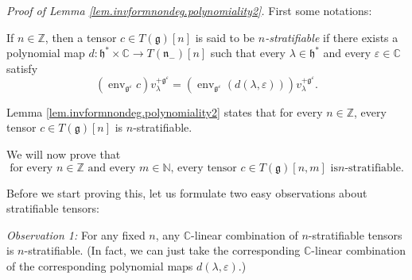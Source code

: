 \documentclass
[numbers=enddot,12pt,final,onecolumn,german,notitlepage]{scrartcl}%
\theoremstyle{definition}
\begin{document}
\textit{Proof of Lemma \ref{lem.invformnondeg.polynomiality2}.} First some notations:

If $n\in\mathbb{Z}$, then a tensor $c\in T\left(  \mathfrak{g}\right)  \left[
n\right]  $ is said to be $n$\textit{-stratifiable} if there exists a
polynomial map $d:\mathfrak{h}^{\ast}\times\mathbb{C}\rightarrow T\left(
\mathfrak{n}_{-}\right)  \left[  n\right]  $ such that every $\lambda
\in\mathfrak{h}^{\ast}$ and every $\varepsilon\in\mathbb{C}$ satisfy%
\[
\left(  \operatorname*{env}\nolimits_{\mathfrak{g}^{\varepsilon}}c\right)
v_{\lambda}^{+\mathfrak{g}^{\varepsilon}}=\left(  \operatorname*{env}%
\nolimits_{\mathfrak{g}^{\varepsilon}}\left(  d\left(  \lambda,\varepsilon
\right)  \right)  \right)  v_{\lambda}^{+\mathfrak{g}^{\varepsilon}}.
\]


Lemma \ref{lem.invformnondeg.polynomiality2} states that for every
$n\in\mathbb{Z}$, every tensor $c\in T\left(  \mathfrak{g}\right)  \left[
n\right]  $ is $n$-stratifiable.

We will now prove that
\begin{equation}
\text{for every }n\in\mathbb{Z}\text{ and every }m\in\mathbb{N}\text{, every
tensor }c\in T\left(  \mathfrak{g}\right)  \left[  n,m\right]  \text{ is
}n\text{-stratifiable.} \label{lem.invformnondeg.polynomiality2.ind}%
\end{equation}


Before we start proving this, let us formulate two easy observations about
stratifiable tensors:

\textit{Observation 1:} For any fixed $n$, any $\mathbb{C}$-linear combination
of $n$-stratifiable tensors is $n$-stratifiable. (In fact, we can just take
the corresponding $\mathbb{C}$-linear combination of the corresponding
polynomial maps $d\left(  \lambda,\varepsilon\right)  $.)
\end{document}
